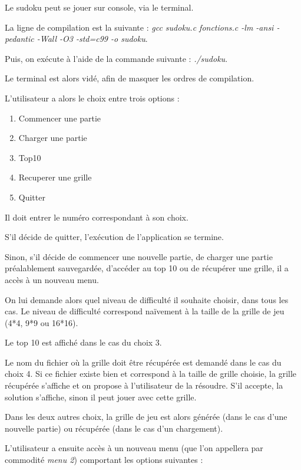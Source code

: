 \documentclass[a4paper, 12pt]{article}
\begin{document}
	\par Le sudoku peut se jouer sur console, via le terminal.
	\par La ligne de compilation est la suivante : \textit{gcc sudoku.c fonctions.c -lm -ansi -pedantic -Wall -O3 -std=c99 -o sudoku}.
	\par Puis, on exécute à l'aide de la commande suivante : \textit{./sudoku}.\\

	\par Le terminal est alors vidé, afin de masquer les ordres de compilation.
	\par L'utilisateur a alors le choix entre trois options :
	\begin{enumerate}
		\item Commencer une partie
		\item Charger une partie
		\item Top10
		\item Recuperer une grille
		\item Quitter\\
	\end{enumerate}

	\par Il doit entrer le numéro correspondant à son choix.\\

	\par S'il décide de quitter, l'exécution de l'application se termine.
	\par Sinon, s'il décide de commencer une nouvelle partie, de charger une partie préalablement sauvegardée, d'accéder au top 10 ou de récupérer une grille, il a accès à un nouveau menu.
	\par On lui demande alors quel niveau de difficulté il souhaite choisir, dans tous les cas. Le niveau de difficulté correspond naïvement à la taille de la grille de jeu (4*4, 9*9 ou 16*16).
	\par Le top 10 est affiché dans le cas du choix 3.
	\par Le nom du fichier où la grille doit être récupérée est demandé dans le cas du choix 4. Si ce fichier existe bien et correspond à la taille de grille choisie, la grille récupérée s'affiche et on propose à l'utilisateur de la résoudre. S'il accepte, la solution s'affiche, sinon il peut jouer avec cette grille.
	\par Dans les deux autres choix, la grille de jeu est alors générée (dans le cas d'une nouvelle partie) ou récupérée (dans le cas d'un chargement).
	\par L'utilisateur a ensuite accès à un nouveau menu (que l'on appellera par commodité \textit{menu 2}) comportant les options suivantes :
\end{document}
